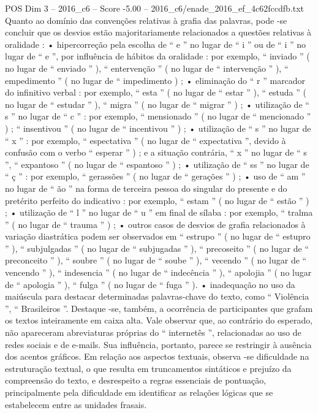 \begin{textsample}{POS Dim 3 – 2016\_c6 – Score -5.00 – 2016\_c6/enade\_2016\_ef\_4c62fccdfb.txt}
Quanto ao domínio das convenções relativas à grafia das palavras, pode -se concluir que os desvios estão majoritariamente relacionados a questões relativas à oralidade : • hipercorreção pela escolha de “ e ” no lugar de “ i ” ou de “ i ” no lugar de “ e ”, por influência de hábitos da oralidade : por exemplo, “ inviado ” ( no lugar de “ enviado ” ), “ entervenção ” ( no lugar de “ intervenção ” ), “ empedimento ” ( no lugar de “ impedimento ) ; • eliminação do “ r ” marcador do infinitivo verbal : por exemplo, “ esta ” ( no lugar de “ estar ” ), “ estuda ” ( no lugar de “ estudar ” ), “ migra ” ( no lugar de “ migrar ” ) ; • utilização de “ s ” no lugar de “ c ” : por exemplo, “ mensionado ” ( no lugar de “ mencionado ” ) ; “ insentivou ” ( no lugar de “ incentivou ” ) ; • utilização de “ s ” no lugar de “ x ” : por exemplo, “ espectativa ” ( no lugar de “ expectativa ”, devido à confusão com o verbo “ esperar ” ) ; e a situação contrária, “ x ” no lugar de “ s ”, “ expantoso ” ( no lugar de “ espantoso ” ) ; • utilização de “ ss ” no lugar de “ ç ” : por exemplo, “ gerassões ” ( no lugar de “ gerações ” ) ; • uso de “ am ” no lugar de “ ão ” na forma de terceira pessoa do singular do presente e do pretérito perfeito do indicativo : por exemplo, “ estam ” ( no lugar de “ estão ” ) ; • utilização de “ l ” no lugar de “ u ” em final de sílaba : por exemplo, “ tralma ” ( no lugar de “ trauma ” ) ; • outros casos de desvios de grafia relacionados à variação diastrática podem ser observados em “ estrupo ” ( no lugar de “ estupro ” ), “ subjulgadas ” ( no lugar de “ subjugadas ” ), “ precoseito ” ( no lugar de “ preconceito ” ), “ soubre ” ( no lugar de “ soube ” ), “ vecendo ” ( no lugar de “ vencendo ” ), “ indesencia ” ( no lugar de “ indecência ” ), “ apolojia ” ( no lugar de “ apologia ” ), “ fulga ” ( no lugar de “ fuga ” ). • inadequação no uso da maiúscula para destacar determinadas palavras-chave do texto, como “ Violência ”, “ Brasileiros ”.
Destaque -se, também, a ocorrência de participantes que grafam os textos inteiramente em caixa alta.
Vale observar que, ao contrário do esperado, não apareceram abreviaturas próprias do “ internetês ”, relacionadas ao uso de redes sociais e de e-mails.
Sua influência, portanto, parece se restringir à ausência dos acentos gráficos.
Em relação aos aspectos textuais, observa -se dificuldade na estruturação textual, o que resulta em truncamentos sintáticos e prejuízo da compreensão do texto, e desrespeito a regras essenciais de pontuação, principalmente pela dificuldade em identificar as relações lógicas que se estabelecem entre as unidades frasais.

\end{textsample}
